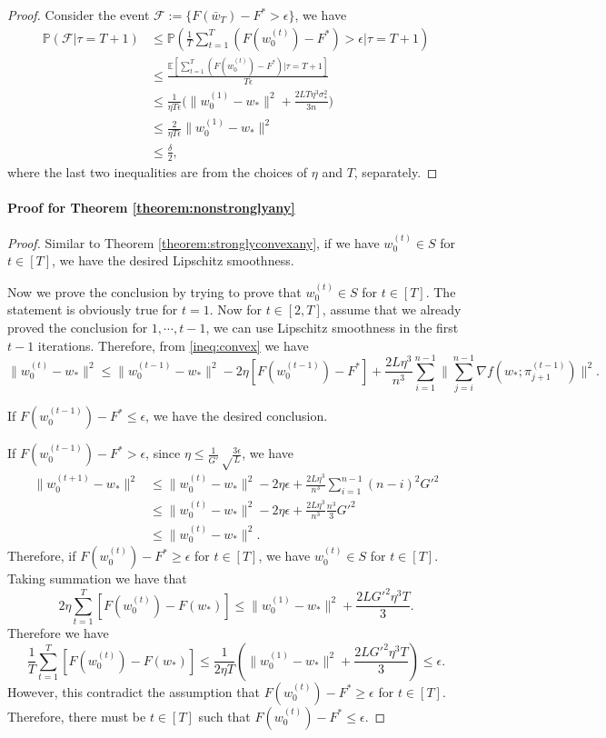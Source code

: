 \documentclass{article} %
\theoremstyle{plain}
\theoremstyle{definition}
\theoremstyle{remark}
\begin{document}
\begin{proof}
    Consider the event $\mathcal{F}:=\{F(\bar{w}_T)-F^*>\epsilon\}$, we have 
    \begin{align*}
        \mathbb{P}(\mathcal{F}|\tau=T+1)&\leq \mathbb{P}(\frac{1}{T}\sum_{t=1}^T (F(w^{(t)}_0)-F^*)>\epsilon|\tau=T+1)\\
        &\leq \frac{\mathbb{E}\left[\sum_{t=1}^T (F(w^{(t)}_0)-F^*)|\tau=T+1\right]}{T\epsilon}\\
        &\leq \frac{1}{\eta T\epsilon} \Big(\|w^{(1)}_0-w_*\|^2+\frac{2LT\eta^3\sigma_*^2}{3n}\Big)\\
        & \leq \frac{2}{\eta T\epsilon}\|w^{(1)}_0-w_*\|^2\\
        & \leq \frac{\delta}{2},
    \end{align*}
    where the last two inequalities are from the choices of $\eta$ and $T$, separately. 
\end{proof}

\paragraph{Proof for Theorem \ref{theorem:nonstronglyany}}

\begin{proof}

Similar to Theorem \ref{theorem:stronglyconvexany}, if we have $w^{(t)}_0\in S$ for $t\in[T]$, we have the desired Lipschitz smoothness.

Now we prove the conclusion by trying to prove that $w^{(t)}_0\in S$ for $t\in[T]$. The statement is obviously true for $t=1$. Now for $t\in[2, T]$, assume that we already proved the conclusion for $1,\cdots, t-1$, we can use Lipschitz smoothness in the first $t-1$ iterations. Therefore, from \eqref{ineq:convex} we have
$$ \|w^{(t)}_0-w_*\|^2\leq \|w^{(t-1)}_0-w_*\|^2-2\eta[F(w^{(t-1)}_0)-F^*]+\frac{2L\eta^3}{n^3}\sum_{i=1}^{n-1}\|\sum_{j=i}^{n-1} \nabla f(w_*;\pi^{(t-1)}_{j+1})\|^2.$$

If $F(w^{(t-1)}_0)-F^*\leq \epsilon$, we have the desired conclusion.

If $F(w^{(t-1)}_0)-F^*> \epsilon$, since $\eta \leq \frac{1}{G'}\sqrt\frac{3\epsilon}{L}$, we have 
\begin{align*}
    \|w^{(t+1)}_0-w_*\|^2 & \leq \|w^{(t)}_0-w_*\|^2-2\eta \epsilon+\frac{2L\eta^3}{n^3}\sum_{i=1}^{n-1}(n-i)^2 G'^2\\
    &\leq \|w^{(t)}_0-w_*\|^2-2\eta \epsilon+\frac{2L\eta^3}{n^3}\frac{n^3}{3}G'^2 \\
    & \leq \|w^{(t)}_0-w_*\|^2.
\end{align*}
Therefore, if $F(w^{(t)}_0)-F^*\geq \epsilon $ for $t\in[T]$, we have $w^{(t)}_0\in S$ for $t\in[T].$ Taking summation we have that 
$$2\eta \sum_{t=1}^T[F(w^{(t)}_0)-F(w_*)]\leq \|w^{(1)}_0-w_*\|^2+\frac{2LG'^2\eta^3T}{3}.$$
Therefore we have 
$$\frac{1}{T} \sum_{t=1}^T[F(w^{(t)}_0)-F(w_*)]\leq \frac{1}{2\eta T}\left(\|w^{(1)}_0-w_*\|^2+\frac{2LG'^2\eta^3T}{3}\right)\leq \epsilon.$$
However, this contradict the assumption that $F(w^{(t)}_0)-F^*\geq \epsilon $ for $t\in[T]$. Therefore, there must be $t\in[T]$ such that $F(w^{(t)}_0)-F^*\leq \epsilon$.

\end{proof}
\end{document}
